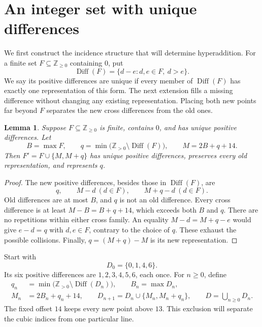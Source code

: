 \documentclass[11pt]{article}
\newtheorem{lemma}[theorem]{Lemma}
\theoremstyle{remark}
\newcommand{\Z}{\mathbb Z}
\DeclareMathOperator{\Diff}{Diff}
\begin{document}
\section{An integer set with unique differences}\label{sec:differences}

We first construct the incidence structure that will determine
hyperaddition. For a finite set $F\subseteq\Z_{\ge0}$ containing $0$, put
\[
 \Diff(F)=\{d-e:d,e\in F,\ d>e\}.
\]
We say its positive differences are unique if every member of
$\Diff(F)$ has exactly one representation of this form.
The next extension fills a missing difference without changing any
existing representation. Placing both new points far beyond $F$
separates the new cross differences from the old ones.

\begin{lemma}\label{lem:extension}
Suppose $F\subseteq\Z_{\ge0}$ is finite, contains $0$, and has unique
positive differences. Let
\[
 B=\max F,\qquad
 q=\min\bigl(\Z_{>0}\setminus\Diff(F)\bigr),\qquad
 M=2B+q+14.
\]
Then $F'=F\cup\{M,M+q\}$ has unique positive differences, preserves
every old representation, and represents $q$.
\end{lemma}

\begin{proof}
The new positive differences, besides those in $\Diff(F)$, are
\[
 q,\qquad M-d\ (d\in F),\qquad M+q-d\ (d\in F).
\]
Old differences are at most $B$, and $q$ is not an old difference.
Every cross difference is at least
$M-B=B+q+14$, which exceeds both $B$ and $q$.
There are no repetitions within either cross family. An equality
$M-d=M+q-e$ would give $e-d=q$ with $d,e\in F$, contrary to the
choice of $q$. These exhaust the possible collisions. Finally,
$q=(M+q)-M$ is its new representation.
\end{proof}

Start with
\begin{equation}\label{eq:seed}
 D_0=\{0,1,4,6\}.
\end{equation}
Its six positive differences are $1,2,3,4,5,6$, each once.
For $n\ge0$, define
\begin{equation}\label{eq:recursion}
 \begin{split}
 q_n&=\min\bigl(\Z_{>0}\setminus\Diff(D_n)\bigr),\qquad
 B_n=\max D_n,\\
 M_n&=2B_n+q_n+14,\qquad
 D_{n+1}=D_n\cup\{M_n,M_n+q_n\},\qquad
 D=\bigcup_{n\ge0}D_n.
 \end{split}
\end{equation}
The fixed offset $14$ keeps every new point above $13$.
This exclusion will separate the cubic indices from one particular line.
\end{document}
